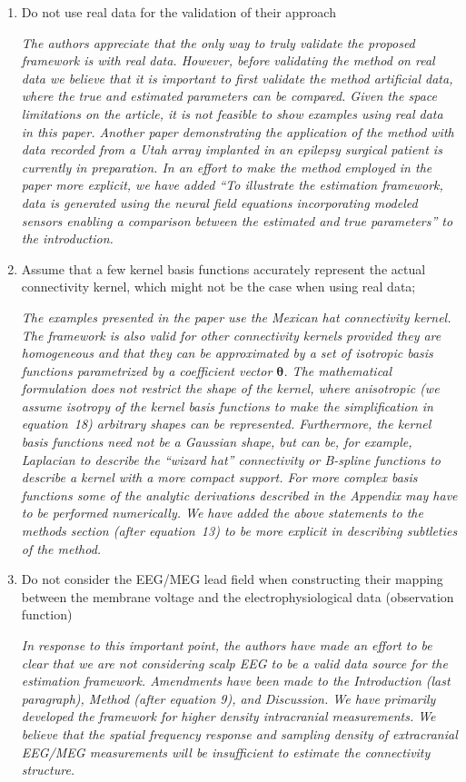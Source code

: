 \documentclass{article}
\begin{document}
    \begin{enumerate}
        \item Do not use real data for the validation of their approach

	\emph{The authors appreciate that the only way to truly validate the proposed framework is with real data. However, before validating the method on real data we believe that it is important to first validate the method artificial data, where the true and estimated parameters can be compared. Given the space limitations on the article, it is not feasible to show examples using real data in this paper. Another paper demonstrating the application of the method with data recorded from a Utah array implanted in an epilepsy surgical patient is currently in preparation. In an effort to make the method employed in the paper more explicit, we have added ``To illustrate the estimation framework, data is generated using the neural field equations incorporating modeled sensors enabling a comparison between the estimated and true parameters'' to the introduction.}
	
        \item Assume that a few kernel basis functions accurately represent the actual connectivity kernel, which might not be the case when using real data;

	\emph{The examples presented in the paper use the Mexican hat connectivity kernel. The framework is also valid for other connectivity kernels provided they are homogeneous and that they can be approximated by a set of isotropic basis functions parametrized by a coefficient vector $\mathbf{\theta}$. The mathematical formulation does not restrict the shape of the kernel, where anisotropic (we assume isotropy of the kernel basis functions to make the simplification in equation~18) arbitrary shapes can be represented. Furthermore, the kernel basis functions need not be a Gaussian shape, but can be, for example, Laplacian to describe the ``wizard hat'' connectivity or B-spline functions to describe a kernel with a more compact support. For more complex basis functions some of the analytic derivations described in the Appendix may have to be performed numerically. We have added the above statements to the methods section (after equation~13) to be more explicit in describing subtleties of the method.}

        \item Do not consider the EEG/MEG lead field when constructing their mapping between the membrane voltage and the electrophysiological data (observation function)

	\emph{In response to this important point, the authors have made an effort to be clear that we are not considering scalp EEG to be a valid data source for the estimation framework. Amendments have been made to the Introduction (last paragraph), Method (after equation 9), and Discussion. We have primarily developed the framework for higher density intracranial measurements. We believe that the spatial frequency response and sampling density of extracranial EEG/MEG measurements will be insufficient to estimate the connectivity structure.}
	
	
    \end{enumerate}
    
\end{document}
